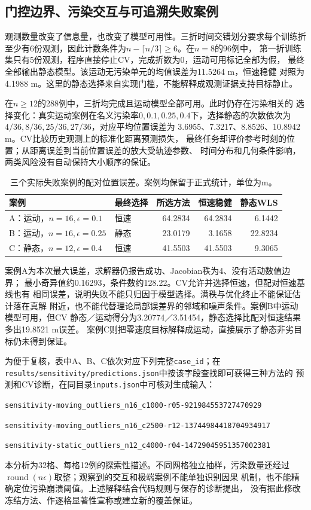 \subsection{门控边界、污染交互与可追溯失败案例}
\label{sec:sensitivity-interpretation}

观测数量改变了信息量，也改变了模型可用性。三折时间交错划分要求每个训练折
至少有6份观测，因此计数条件为$n-\lceil n/3\rceil\geq6$。在$n=8$的96例中，
第一折训练集只有5份观测，程序直接停止CV，完成折数为0，运动可用标记全部为假，
最终全部输出静态模型。该运动无污染单元的均值误差为11.5264 m，恒速稳健
对照为4.1988 m。这里的静态选择来自实现门槛，不能解释成观测证据支持目标静止。

在$n\geq12$的288例中，三折均完成且运动模型全部可用。此时仍存在污染相关的
选择变化：真实运动案例在名义污染率$0,0.1,0.25,0.4$下，选择静态的次数依次为
$4/36,8/36,25/36,27/36$，对应平均位置误差为
3.6955、7.3217、8.8526、10.8942 m。CV比较历史观测上的标准化距离预测损失，
最终任务却评价参考时刻的位置；从距离误差到当前位置误差的放大受轨迹参数、
时间分布和几何条件影响，两类风险没有自动保持大小顺序的保证。

\begin{table}[H]
  \centering
  \small
  \caption{三个实际失败案例的配对位置误差。案例均保留于正式统计，单位为m。}
  \label{tab:sensitivity-failures}
  \begin{tabular}{llrrr}
    \toprule
    案例 & 最终选择 & 所选方法 & 恒速稳健 & 静态WLS\\
    \midrule
    A：运动，$n=16,\epsilon=0.1$ & 恒速 & 64.2834 & 64.2834 & 6.1442\\
    B：运动，$n=16,\epsilon=0.25$ & 静态 & 23.0179 & 3.1658 & 22.8234\\
    C：静态，$n=12,\epsilon=0.4$ & 恒速 & 41.5503 & 41.5503 & 9.3065\\
    \bottomrule
  \end{tabular}
\end{table}

案例A为本次最大误差，求解器仍报告成功、Jacobian秩为4、没有活动数值边界；
最小奇异值约0.16293，条件数约128.22。CV允许并选择恒速，但配对恒速基线也有
相同误差，说明失败不能只归因于模型选择。满秩与优化终止不能保证估计落在真解
附近，也不能代替理论局部误差界的邻域和噪声条件。案例B中运动模型可用，但CV
静态／运动得分为3.20774／3.51454，静态选择比配对恒速结果多出19.8521 m误差。
案例C则把零速度目标解释成运动，直接展示了静态非劣目标仍未得到保证。

为便于复核，表中A、B、C依次对应下列完整\texttt{case\_id}；在
\nolinkurl{results/sensitivity/predictions.json}中按该字段查找即可获得三种方法的
预测和CV诊断，在同目录\texttt{inputs.json}中可核对生成输入：
\begin{description}[leftmargin=1.6em,labelsep=0.4em,font=\normalfont\bfseries]
  \item[A] \nolinkurl{sensitivity-moving_outliers_n16_c1000-r05-921984553727470929}
  \item[B] \nolinkurl{sensitivity-moving_outliers_n16_c2500-r12-13744984418704934917}
  \item[C] \nolinkurl{sensitivity-static_outliers_n12_c4000-r04-14729045951357002381}
\end{description}

本分析为32格、每格12例的探索性描述。不同网格独立抽样，污染数量还经过
$\operatorname{round}(n\epsilon)$取整；观察到的交互和极端案例不能单独识别因果
机制，也不能精确定位污染崩溃阈值。上述解释结合代码规则与保存的诊断提出，
没有据此修改冻结方法、作逐格显著性宣称或建立新的覆盖保证。
